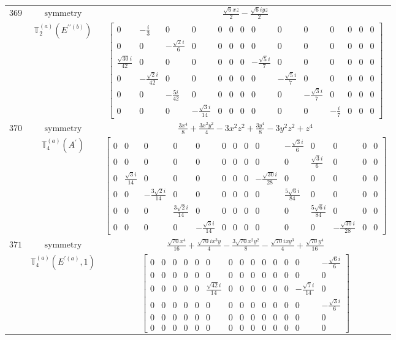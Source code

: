\documentclass[fleqn,8pt,landscape]{jsarticle}
\begin{document}
\begin{longtable}{ccc}
$ 369 $ & $ \text{symmetry} $ & $ \frac{\sqrt{6} x z}{2} - \frac{\sqrt{6} i y z}{2} $ \\
$  $ & $ \mathbb{T}_{2}^{(a)}(E^{\prime\prime(b)}) $ & $ \begin{bmatrix} 0 & - \frac{i}{3} & 0 & 0 & 0 & 0 & 0 & 0 & 0 & 0 & 0 & 0 & 0 & 0 \\ 0 & 0 & - \frac{\sqrt{2} i}{6} & 0 & 0 & 0 & 0 & 0 & 0 & 0 & 0 & 0 & 0 & 0 \\ \frac{\sqrt{30} i}{42} & 0 & 0 & 0 & 0 & 0 & 0 & - \frac{\sqrt{5} i}{7} & 0 & 0 & 0 & 0 & 0 & 0 \\ 0 & - \frac{\sqrt{2} i}{42} & 0 & 0 & 0 & 0 & 0 & 0 & - \frac{\sqrt{5} i}{7} & 0 & 0 & 0 & 0 & 0 \\ 0 & 0 & - \frac{5 i}{42} & 0 & 0 & 0 & 0 & 0 & 0 & - \frac{\sqrt{3} i}{7} & 0 & 0 & 0 & 0 \\ 0 & 0 & 0 & - \frac{\sqrt{3} i}{14} & 0 & 0 & 0 & 0 & 0 & 0 & - \frac{i}{7} & 0 & 0 & 0 \end{bmatrix} $ \\ \hline
$ 370 $ & $ \text{symmetry} $ & $ \frac{3 x^{4}}{8} + \frac{3 x^{2} y^{2}}{4} - 3 x^{2} z^{2} + \frac{3 y^{4}}{8} - 3 y^{2} z^{2} + z^{4} $ \\
$  $ & $ \mathbb{T}_{4}^{(a)}(A^{\prime}) $ & $ \begin{bmatrix} 0 & 0 & 0 & 0 & 0 & 0 & 0 & 0 & 0 & - \frac{\sqrt{3} i}{6} & 0 & 0 & 0 & 0 \\ 0 & 0 & 0 & 0 & 0 & 0 & 0 & 0 & 0 & 0 & \frac{\sqrt{3} i}{6} & 0 & 0 & 0 \\ 0 & \frac{\sqrt{3} i}{14} & 0 & 0 & 0 & 0 & 0 & 0 & - \frac{\sqrt{30} i}{28} & 0 & 0 & 0 & 0 & 0 \\ 0 & 0 & - \frac{3 \sqrt{2} i}{14} & 0 & 0 & 0 & 0 & 0 & 0 & \frac{5 \sqrt{6} i}{84} & 0 & 0 & 0 & 0 \\ 0 & 0 & 0 & \frac{3 \sqrt{2} i}{14} & 0 & 0 & 0 & 0 & 0 & 0 & \frac{5 \sqrt{6} i}{84} & 0 & 0 & 0 \\ 0 & 0 & 0 & 0 & - \frac{\sqrt{3} i}{14} & 0 & 0 & 0 & 0 & 0 & 0 & - \frac{\sqrt{30} i}{28} & 0 & 0 \end{bmatrix} $ \\ \hline
$ 371 $ & $ \text{symmetry} $ & $ \frac{\sqrt{70} x^{4}}{16} + \frac{\sqrt{70} i x^{3} y}{4} - \frac{3 \sqrt{70} x^{2} y^{2}}{8} - \frac{\sqrt{70} i x y^{3}}{4} + \frac{\sqrt{70} y^{4}}{16} $ \\
$  $ & $ \mathbb{T}_{4}^{(a)}(E^{\prime(a)},1) $ & $ \begin{bmatrix} 0 & 0 & 0 & 0 & 0 & 0 & 0 & 0 & 0 & 0 & 0 & 0 & 0 & - \frac{\sqrt{6} i}{6} \\ 0 & 0 & 0 & 0 & 0 & 0 & 0 & 0 & 0 & 0 & 0 & 0 & 0 & 0 \\ 0 & 0 & 0 & 0 & 0 & \frac{\sqrt{42} i}{14} & 0 & 0 & 0 & 0 & 0 & 0 & - \frac{\sqrt{7} i}{14} & 0 \\ 0 & 0 & 0 & 0 & 0 & 0 & 0 & 0 & 0 & 0 & 0 & 0 & 0 & - \frac{\sqrt{3} i}{6} \\ 0 & 0 & 0 & 0 & 0 & 0 & 0 & 0 & 0 & 0 & 0 & 0 & 0 & 0 \\ 0 & 0 & 0 & 0 & 0 & 0 & 0 & 0 & 0 & 0 & 0 & 0 & 0 & 0 \end{bmatrix} $ \\ \hline

\end{longtable}
\end{document}
